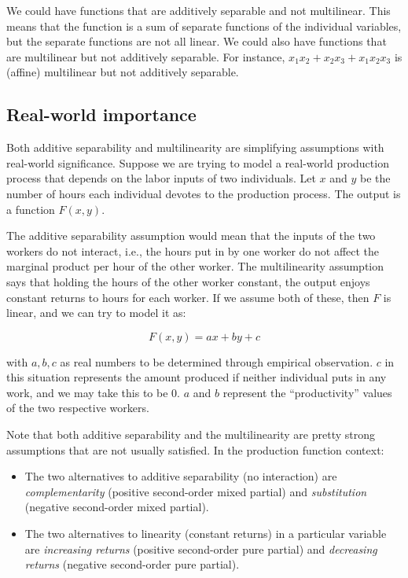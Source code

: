 \documentclass[10pt]{amsart}
\begin{document}
We could have functions that are additively separable and not
multilinear. This means that the function is a sum of separate
functions of the individual variables, but the separate functions are
not all linear. We could also have functions that are multilinear but
not additively separable. For instance, $x_1x_2 + x_2x_3 + x_1x_2x_3$
is (affine) multilinear but not additively separable.

\subsection{Real-world importance}

Both additive separability and multilinearity are simplifying
assumptions with real-world significance. Suppose we are trying to
model a real-world production process that depends on the labor inputs
of two individuals. Let $x$ and $y$ be the number of hours each
individual devotes to the production process. The output is a function
$F(x,y)$.

The additive separability assumption would mean that the inputs of the
two workers do not interact, i.e., the hours put in by one worker do
not affect the marginal product per hour of the other worker. The
multilinearity assumption says that holding the hours of the other
worker constant, the output enjoys constant returns to hours for each
worker. If we assume both of these, then $F$ is linear, and we can try
to model it as:

$$F(x,y) = ax + by + c$$

with $a,b,c$ as real numbers to be determined through empirical
observation. $c$ in this situation represents the amount produced if
neither individual puts in any work, and we may take this to be
$0$. $a$ and $b$ represent the ``productivity'' values of the two
respective workers.

Note that both additive separability and the multilinearity are
pretty strong assumptions that are not usually satisfied. In the
production function context:

\begin{itemize}
\item The two alternatives to additive separability (no interaction)
  are {\em complementarity} (positive second-order mixed partial) and
  {\em substitution} (negative second-order mixed partial).
\item The two alternatives to linearity (constant returns) in a
  particular variable are {\em increasing returns} (positive
  second-order pure partial) and {\em decreasing returns} (negative
  second-order pure partial).
\end{itemize}
\end{document}
